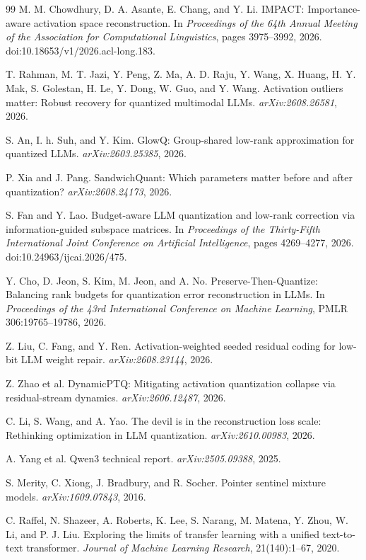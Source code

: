 \documentclass[11pt]{article}
\begin{document}
\begin{thebibliography}{99}
M. M. Chowdhury, D. A. Asante, E. Chang, and Y. Li.
\newblock IMPACT: Importance-aware activation space reconstruction.
\newblock In \emph{Proceedings of the 64th Annual Meeting of the Association for Computational Linguistics}, pages 3975--3992, 2026. doi:10.18653/v1/2026.acl-long.183.

T. Rahman, M. T. Jazi, Y. Peng, Z. Ma, A. D. Raju, Y. Wang, X. Huang, H. Y. Mak, S. Golestan, H. Le, Y. Dong, W. Guo, and Y. Wang.
\newblock Activation outliers matter: Robust recovery for quantized multimodal LLMs.
\newblock \emph{arXiv:2608.26581}, 2026.

S. An, I. h. Suh, and Y. Kim.
\newblock GlowQ: Group-shared low-rank approximation for quantized LLMs.
\newblock \emph{arXiv:2603.25385}, 2026.

P. Xia and J. Pang.
\newblock SandwichQuant: Which parameters matter before and after quantization?
\newblock \emph{arXiv:2608.24173}, 2026.

S. Fan and Y. Lao.
\newblock Budget-aware LLM quantization and low-rank correction via information-guided subspace matrices.
\newblock In \emph{Proceedings of the Thirty-Fifth International Joint Conference on Artificial Intelligence}, pages 4269--4277, 2026. doi:10.24963/ijcai.2026/475.

Y. Cho, D. Jeon, S. Kim, M. Jeon, and A. No.
\newblock Preserve-Then-Quantize: Balancing rank budgets for quantization error reconstruction in LLMs.
\newblock In \emph{Proceedings of the 43rd International Conference on Machine Learning}, PMLR 306:19765--19786, 2026.

Z. Liu, C. Fang, and Y. Ren.
\newblock Activation-weighted seeded residual coding for low-bit LLM weight repair.
\newblock \emph{arXiv:2608.23144}, 2026.

Z. Zhao et al.
\newblock DynamicPTQ: Mitigating activation quantization collapse via residual-stream dynamics.
\newblock \emph{arXiv:2606.12487}, 2026.

C. Li, S. Wang, and A. Yao.
\newblock The devil is in the reconstruction loss scale: Rethinking optimization in LLM quantization.
\newblock \emph{arXiv:2610.00983}, 2026.

A. Yang et al.
\newblock Qwen3 technical report.
\newblock \emph{arXiv:2505.09388}, 2025.

S. Merity, C. Xiong, J. Bradbury, and R. Socher.
\newblock Pointer sentinel mixture models.
\newblock \emph{arXiv:1609.07843}, 2016.

C. Raffel, N. Shazeer, A. Roberts, K. Lee, S. Narang, M. Matena, Y. Zhou, W. Li, and P. J. Liu.
\newblock Exploring the limits of transfer learning with a unified text-to-text transformer.
\newblock \emph{Journal of Machine Learning Research}, 21(140):1--67, 2020.

\end{thebibliography}
\end{document}
